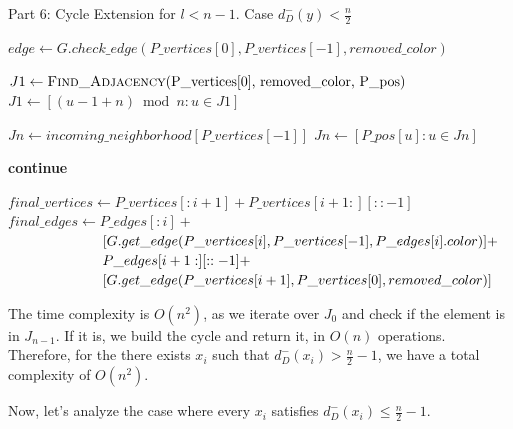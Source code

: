\begin{algorithm}[H]
    \caption{Part 6: Cycle Extension for \( l < n - 1 \). Case \( d^-_D(y) < \frac{n}{2} \)}
    \begin{algorithmic}[1]
            \State $edge \gets G.check\_edge(P\_vertices[0], P\_vertices[-1], removed\_color)$
                \State \Return {}
            \EndIf

            \State $J1 \gets \Call{Find\_Adjacency}{$P\_vertices[0], removed\_color, P\_pos$}$
            \State $J1 \gets [(u - 1 + n) \bmod n : u \in J1]$

            \State $Jn \gets incoming\_neighborhood[P\_vertices[-1]]$
            \State $Jn \gets [P\_pos[u] : u \in Jn]$

                        \State \textbf{continue}
                    \EndIf

                    \State $final\_vertices \gets P\_vertices[:i+1] + P\_vertices[i+1:][::-1]$
                    \State $final\_edges \gets P\_edges[:i] +$
                    \State $\hspace{6.7em} [G.get\_edge(P\_vertices[i], P\_vertices[-1], P\_edges[i].color)] +$
                    \State $\hspace{6.7em} P\_edges[i+1:][::-1] +$
                    \State $\hspace{6.7em} [G.get\_edge(P\_vertices[i+1], P\_vertices[0], removed\_color)]$

                    \State \Return {}
                \EndIf
            \EndFor
        \EndFunction
    \end{algorithmic}
\end{algorithm}

The time complexity is $O(n^2)$, as we iterate over $J_0$ and check 
if the element is in $J_{n-1}$. If it is, we build the cycle and return it, in $O(n)$ operations.
Therefore, for the there exists $x_i$ such that $d^-_D(x_i) > \frac{n}{2} - 1$, we have a total 
complexity of $O(n^2)$.

Now, let's analyze the case where every $x_i$ satisfies $d^-_D(x_i) \leq \frac{n}{2} - 1$.